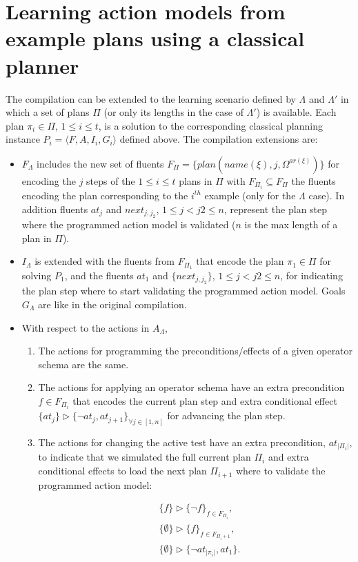 \documentclass[letterpaper]{article} %
\newcommand{\tup}[1]{{\langle #1 \rangle}}
\begin{document}
\section{Learning action models from example plans using a classical planner}
The compilation can be extended to the learning scenario defined by $\Lambda$ and $\Lambda'$ in which a set of plans $\Pi$ (or only its lengths in the case of $\Lambda'$) is available. Each plan $\pi_i\in \Pi$, {\small $1\leq i\leq t$}, is a solution to the corresponding classical planning instance $P_i=\tup{F,A,I_i,G_i}$ defined above. The compilation extensions are: 
\begin{itemize}
\item $F_{\Lambda}$ includes the new set of fluents $F_{\Pi}=\{plan(name(\xi),j,\Omega^{ar(\xi)})\}$ for encoding the $j$ steps of the {\small $1\leq i\leq t$} plans in $\Pi$ with $F_{\Pi_i}\subseteq F_{\Pi}$ the fluents encoding the plan corresponding to the $i^{th}$ example (only for the $\Lambda$ case). In addition fluents $at_j$ and $next_{j,j_2}$, {\small $1\leq j<j2\leq n$}, represent the plan step where the programmed action model is validated ($n$ is the max length of a plan in $\Pi$).
\item $I_{\Lambda}$ is extended with the fluents from $F_{\Pi_1}$ that encode the plan $\pi_1\in \Pi$ for solving $P_1$, and the fluents $at_1$ and $\{next_{j,j_2}\}$, {\small $1\leq j<j2\leq n$}, for indicating the plan step where to start validating the programmed action model. Goals $G_{\Lambda}$ are like in the original compilation.
\item With respect to the actions in $A_{\Lambda}$,
\begin{enumerate}
\item The actions for programming the preconditions/effects of a given operator schema are the same.
\item The actions for applying an operator schema have an extra precondition $f\in F_{\Pi_i}$ that encodes the current plan step and extra conditional effect $\{at_{j}\}\rhd\{\neg at_{j},at_{j+1}\}_{\forall j\in [1,n]}$ for advancing the plan step.
\item The actions for changing the active test have an extra precondition, $at_{|\Pi_i|}$, to indicate that we simulated the full current plan $\Pi_i$ and extra conditional effects to load the next plan $\Pi_{i+1}$ where to validate the programmed action model:
\begin{small}
\begin{align*}
&\{f\}\rhd\{\neg f\}_{f\in F_{\Pi_i}},\\
&\{\emptyset\}\rhd\{f\}_{f\in F_{\Pi_i+1}},\\
&\{\emptyset\}\rhd\{\neg at_{|\pi_i|},at_1\}.
\end{align*}
\end{small}
\end{enumerate}
\end{itemize}
\end{document}
